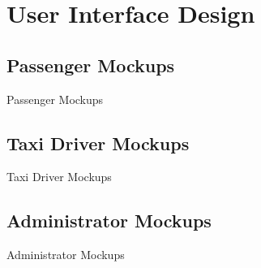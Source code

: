 \documentclass{../common/latex_classes/pdf_presentation}
\begin{document}
	\section{User Interface Design}
	
	\subsection{Passenger Mockups}
	
	\begin{frame}{Passenger Mockups}
	\end{frame}
	
	\subsection{Taxi Driver Mockups}
	
	\begin{frame}{Taxi Driver Mockups}
	\end{frame}
	
	\subsection{Administrator Mockups}
	
	\begin{frame}{Administrator Mockups}
	\end{frame}
	
\end{document}
